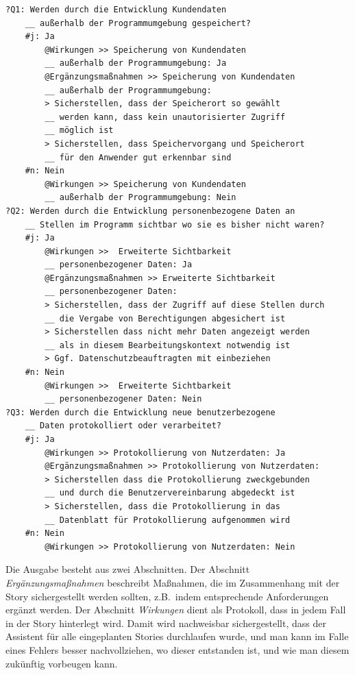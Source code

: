 \label{BspPOAssi}
\begin{verbatim}
?Q1: Werden durch die Entwicklung Kundendaten
    __ außerhalb der Programmumgebung gespeichert?
    #j: Ja
        @Wirkungen >> Speicherung von Kundendaten 
        __ außerhalb der Programmumgebung: Ja
        @Ergänzungsmaßnahmen >> Speicherung von Kundendaten 
        __ außerhalb der Programmumgebung:
        > Sicherstellen, dass der Speicherort so gewählt 
        __ werden kann, dass kein unautorisierter Zugriff 
        __ möglich ist
        > Sicherstellen, dass Speichervorgang und Speicherort
        __ für den Anwender gut erkennbar sind
    #n: Nein
        @Wirkungen >> Speicherung von Kundendaten 
        __ außerhalb der Programmumgebung: Nein
?Q2: Werden durch die Entwicklung personenbezogene Daten an 
    __ Stellen im Programm sichtbar wo sie es bisher nicht waren? 
    #j: Ja
        @Wirkungen >>  Erweiterte Sichtbarkeit 
        __ personenbezogener Daten: Ja
        @Ergänzungsmaßnahmen >> Erweiterte Sichtbarkeit 
        __ personenbezogener Daten:
        > Sicherstellen, dass der Zugriff auf diese Stellen durch
        __ die Vergabe von Berechtigungen abgesichert ist
        > Sicherstellen dass nicht mehr Daten angezeigt werden
        __ als in diesem Bearbeitungskontext notwendig ist
        > Ggf. Datenschutzbeauftragten mit einbeziehen
    #n: Nein
        @Wirkungen >>  Erweiterte Sichtbarkeit 
        __ personenbezogener Daten: Nein
?Q3: Werden durch die Entwicklung neue benutzerbezogene
    __ Daten protokolliert oder verarbeitet? 
    #j: Ja
        @Wirkungen >> Protokollierung von Nutzerdaten: Ja
        @Ergänzungsmaßnahmen >> Protokollierung von Nutzerdaten:
        > Sicherstellen dass die Protokollierung zweckgebunden
        __ und durch die Benutzervereinbarung abgedeckt ist
        > Sicherstellen, dass die Protokollierung in das 
        __ Datenblatt für Protokollierung aufgenommen wird
    #n: Nein
        @Wirkungen >> Protokollierung von Nutzerdaten: Nein
\end{verbatim}

Die Ausgabe besteht aus zwei Abschnitten. Der Abschnitt \emph{Ergänzungsmaßnahmen} beschreibt Maßnahmen, die im Zusammenhang mit der Story sichergestellt werden sollten, z.B.\ indem entsprechende Anforderungen ergänzt werden. Der Abschnitt \emph{Wirkungen} dient als Protokoll, dass in jedem Fall in der Story hinterlegt wird. Damit wird nachweisbar sichergestellt, dass der Assistent für alle eingeplanten Stories durchlaufen wurde, und man kann im Falle eines Fehlers besser nachvollziehen, wo dieser entstanden ist, und wie man diesem zukünftig vorbeugen kann.

